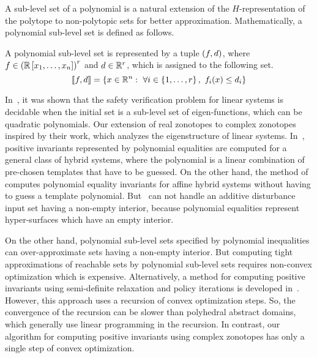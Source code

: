 A sub-level set of a polynomial is a natural extension of the
$H$-representation of the polytope to non-polytopic sets for
better approximation.  Mathematically, a polynomial sub-level
set is defined as follows.
%
\begin{definition}
A polynomial sub-level set is represented by a tuple $\left(f,d\right)$,
where 
$f\in\left(\mathbb{R}\left[x_1,\ldots,x_n\right]\right)^r$ and $d\in\mathbb{R}^r$,
which is assigned to the following set.
%
\[
\left\llbracket f,d\right\rrbracket=\left\{x\in\mathbb{R}^n:~\forall
  i\in\left\{1,\ldots,r\right\},~f_i(x)\leq d_i\right\}
\]
%
\end{definition}
%
In~\cite{duggirala2013safety}, it was shown that the safety
verification problem for linear systems is decidable when the initial
set is a sub-level set of eigen-functions, which can be quadratic
polynomials.  Our extension of real zonotopes to complex zonotopes
inspired by their work, which analyzes the eigenstructure of linear
systems.  In~\cite{Sriram}, positive invariants represented by
polynomial equalities are computed for a general class of hybrid
systems, where the polynomial is a linear combination of pre-chosen
templates that have to be guessed.  On the other hand, the method
of~\cite{tiwariRodriguezCarbonellPolynomialInvariants} computes
polynomial equality invariants for affine hybrid systems without
having to guess a template polynomial.  But~\cite{Sriram,tiwariRodriguezCarbonellPolynomialInvariants}
can not handle an additive disturbance input set having a non-empty
interior, because polynomial equalities represent hyper-surfaces which
have an empty interior.

On the other hand, polynomial sub-level sets specified by polynomial
inequalities can over-approximate sets having a non-empty interior.
But computing tight approximations of reachable sets by polynomial
sub-level sets requires non-convex
optimization which is expensive.
Alternatively, a method for computing positive invariants using
semi-definite relaxation and policy iterations is developed
in~\cite{DBLP:conf/esop/AdjeGG10}.  However, this approach uses a recursion
of convex optimization steps.  So, the convergence of the recursion
can be slower than polyhedral abstract domains, which generally use
linear programming in the recursion.  In contrast, our algorithm for
computing positive invariants using complex zonotopes has only a single step of convex optimization.
